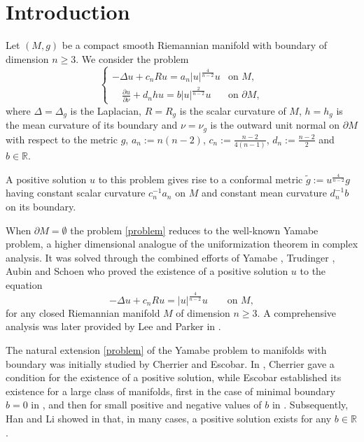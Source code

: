 \documentclass[reqno,11pt,oneside]{amsart}
\numberwithin{equation}{section}
\def\r{\mathbb{R}}
\def\tilde{\widetilde}
\begin{document}
\section{Introduction}

Let $(M,g)$ be a compact smooth Riemannian manifold with boundary of dimension $n\geq 3$.  We consider the problem
\begin{equation}\label{problem}
\begin{cases}
 -\Delta u + c_nRu= a_n|u|^\frac{4}{n-2}u &\text{on \ } M,\\
 \quad\frac{\partial u}{\partial\nu} + d_nhu= b|u|^\frac{2}{n-2}u &\text{on \ }\partial M,
\end{cases}
\end{equation}
where $\Delta=\Delta_g$ is the Laplacian, $R=R_g$ is the scalar curvature of $M$, $h=h_g$ is the mean curvature of its boundary and $\nu=\nu_g$ is the outward unit normal on $\partial M$ with respect to the metric $g$, $a_n:=n(n-2)$, $c_n:=\frac{n-2}{4(n-1)}$, $d_n:=\frac{n-2}{2}$ and $b\in\r$.

A positive solution $u$ to this problem gives rise to a conformal metric $\tilde{g}:=u^\frac{4}{n-2}g$ having constant scalar curvature $c_n^{-1}a_n$ on $M$ and constant mean curvature $d_n^{-1}b$ on its boundary.

When $\partial M=\emptyset$ the problem \eqref{problem} reduces to the well-known Yamabe problem, a higher dimensional analogue of the uniformization theorem in complex analysis. It was solved through the combined efforts of Yamabe \cite{yamabe}, Trudinger \cite{trudinger}, Aubin \cite{aubin} and Schoen \cite{schoen} who proved the existence of a positive solution $u$ to the equation
\begin{equation}\label{eq:yamabe}
-\Delta u + c_nRu=|u|^\frac{4}{n-2}u \qquad\text{on \ } M,
\end{equation}
for any closed  Riemannian manifold $M$ of dimension $n\geq 3$. A comprehensive analysis was later provided by Lee and Parker in \cite{lp}.

The natural extension \eqref{problem} of the Yamabe problem to manifolds with boundary was initially studied by Cherrier and Escobar. In \cite{che}, Cherrier gave a condition for the existence of a positive solution, while Escobar established its existence for a large class of manifolds, first in the case of minimal boundary $b=0$ in \cite{e1}, and then for small positive and negative values of $b$ in \cite{e4}. Subsequently, Han and Li showed in \cite{hl0,hl} that, in many cases, a positive solution exists for any $b\in\r$.
\end{document}
